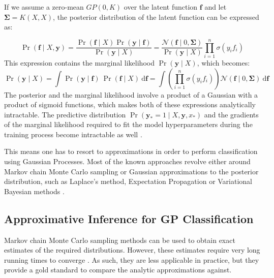 \documentclass[a4paper,12pt ]{report}
\renewcommand{\GP}{{GP}}
\begin{document}
If we assume a zero-mean $\GP(0, K)$ over the latent function $\mathbf{f}$ and let $\bm{\Sigma} = K(X, X)$, the posterior distribution of the latent function can be expressed as:

\begin{equation*}  \displaystyle  \Pr( \mathbf{f}  \mid X, \mathbf{y} ) = \frac{ \Pr(\mathbf{f} \mid X)  \Pr( \mathbf{y} \mid \mathbf{f}) }{\Pr(\mathbf{y} \mid X)}  =
 \frac{ \mathcal{N}( \mathbf{f} \mid 0, \bm{\Sigma} ) }{ \Pr(\mathbf{y} \mid X) } \prod_{i=1}^{n}{\sigma(y_i f_i)}   \end{equation*}
This expression contains the marginal likelihood $\Pr(\mathbf{y} \mid X)$, which becomes:
\begin{equation*} \displaystyle \Pr( \mathbf{y} \mid X  ) = \int{ \Pr ( \mathbf{y} \mid \mathbf{f} ) ~ \Pr( \mathbf{f} \mid X ) ~ \mathrm{d}\mathbf{f}  =  \int{  \left( \prod_{i=1}^{n}{\sigma(y_i f_i)} \right) \mathcal{N}( \mathbf{f} \mid 0, \bm{\Sigma} )  ~ \mathrm{d}\mathbf{f}  }}  \end{equation*}
The posterior and the marginal likelihood involve a product of a Gaussian with a product of sigmoid functions, which makes both of these expressions analytically intractable. The predictive distribution $ \Pr( \mathbf{y_{*}} = 1 \mid X, \mathbf{y}, x_{*})$ and the gradients of the marginal likelihood required to fit the model hyperparameters during the training process become intractable as well \cite{rasmussen06, gpcapprox, gpcinference}.

This means one has to resort to approximations in order to perform classification using Gaussian Processes. Most of the known approaches revolve either around Markov chain Monte Carlo sampling or Gaussian approximations to the posterior distribution, such as Laplace's method, Expectation Propagation or Variational Bayesian methods \cite{gpcinference}. %


\subsection{Approximative Inference for {\GP} Classification}

Markov chain Monte Carlo sampling methods can be used to obtain exact estimates of the required distributions. However, these estimates require very long running times to converge \cite{gpcapprox}. As such, they are less applicable in practice, but they provide a gold standard to compare the analytic approximations against.
\end{document}
